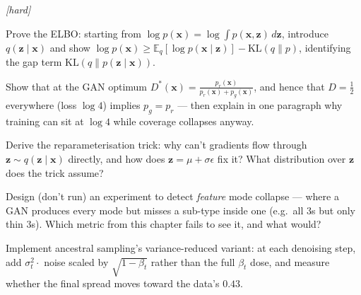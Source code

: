 \emph{[hard]}
\begin{exercise}
Prove the ELBO: starting from $\log p(\mathbf x) = \log \int p(\mathbf
x,\mathbf z)\,d\mathbf z$, introduce $q(\mathbf z\mid\mathbf x)$ and
show $\log p(\mathbf x) \geq \mathbb E_q[\log p(\mathbf x\mid\mathbf
z)] - \mathrm{KL}(q\|p)$, identifying the gap term
$\mathrm{KL}(q\|p(\mathbf z\mid\mathbf x))$.
\end{exercise}
\begin{exercise}
Show that at the GAN optimum $D^*(\mathbf x) =
\frac{p_r(\mathbf x)}{p_r(\mathbf x)+p_g(\mathbf x)}$, and hence that
$D{=}\tfrac12$ everywhere (loss $\log 4$) implies $p_g = p_r$ ---
then explain in one paragraph why training can sit at $\log 4$ while
coverage collapses anyway.
\end{exercise}
\begin{exercise}
Derive the reparameterisation trick: why can't gradients flow through
$\mathbf z \sim q(\mathbf z\mid\mathbf x)$ directly, and how does
$\mathbf z = \mu + \sigma\epsilon$ fix it? What distribution over
$\mathbf z$ does the trick assume?
\end{exercise}
\begin{exercise}
Design (don't run) an experiment to detect \emph{feature} mode
collapse --- where a GAN produces every mode but misses a sub-type
inside one (e.g.\ all 3s but only thin 3s). Which metric from this
chapter fails to see it, and what would?
\end{exercise}
\begin{exercise}
Implement ancestral sampling's variance-reduced variant: at each
denoising step, add $\sigma_t^2 \cdot$ noise scaled by
$\sqrt{1-\beta_t}$ rather than the full $\beta_t$ dose, and measure
whether the final spread moves toward the data's $0.43$.
\end{exercise}


